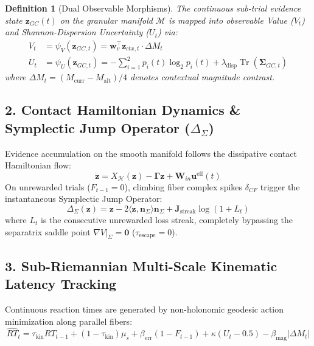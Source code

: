 \documentclass[11pt,a4paper]{article}
\newtheorem{definition}{Definition}
\begin{document}
\begin{definition}[Dual Observable Morphisms]
The continuous sub-trial evidence state $\mathbf{z}_{GC}(t)$ on the granular manifold $\mathcal{M}$ is mapped into observable Value ($V_t$) and Shannon-Dispersion Uncertainty ($U_t$) via:
\begin{align}
V_t &= \psi_V(\mathbf{z}_{GC,t}) = \mathbf{w}_v^\top \mathbf{z}_{ctx,t} \cdot \Delta M_t \\
U_t &= \psi_U(\mathbf{z}_{GC,t}) = -\sum_{i=1}^2 p_i(t) \log_2 p_i(t) + \lambda_{\text{disp}} \operatorname{Tr}(\mathbf{\Sigma}_{GC,t})
\end{align}
where $\Delta M_t = (M_{\text{curr}} - M_{\text{alt}})/4$ denotes contextual magnitude contrast.
\end{definition}

\subsection{2. Contact Hamiltonian Dynamics \& Symplectic Jump Operator ($\Delta_\Sigma$)}
Evidence accumulation on the smooth manifold follows the dissipative contact Hamiltonian flow:
\begin{equation}
\dot{\mathbf{z}} = X_{\mathcal{H}}(\mathbf{z}) - \mathbf{\Gamma} \mathbf{z} + \mathbf{W}_{in} \mathbf{u}^{\text{eff}}(t)
\end{equation}
On unrewarded trials ($F_{t-1} = 0$), climbing fiber complex spikes $\delta_{CF}$ trigger the instantaneous Symplectic Jump Operator:
\begin{equation}
\Delta_\Sigma(\mathbf{z}) = \mathbf{z} - 2\langle \mathbf{z}, \mathbf{n}_\Sigma \rangle \mathbf{n}_\Sigma + \mathbf{J}_{\text{streak}} \log(1 + L_t)
\end{equation}
where $L_t$ is the consecutive unrewarded loss streak, completely bypassing the separatrix saddle point $\nabla V|_\Sigma = \mathbf{0}$ ($\tau_{\text{escape}} = 0$).

\subsection{3. Sub-Riemannian Multi-Scale Kinematic Latency Tracking}
Continuous reaction times are generated by non-holonomic geodesic action minimization along parallel fibers:
\begin{equation}
\widehat{RT}_t = \tau_{\text{kin}} RT_{t-1} + (1 - \tau_{\text{kin}}) \mu_s + \beta_{\text{err}} (1 - F_{t-1}) + \kappa (U_t - 0.5) - \beta_{\text{mag}} |\Delta M_t|
\end{equation}
\end{document}
